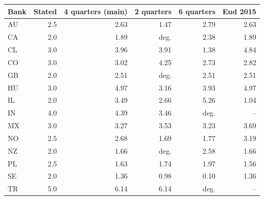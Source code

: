 \begin{tabular}{lrrrrr}\toprule
Bank & Stated & 4 quarters (main) & 2 quarters & 6 quarters & End 2015\\\midrule
AU & 2.5 & 2.63 & 1.47 & 2.79 & 2.63\\
CA & 2.0 & 1.89 & deg. & 2.38 & 1.89\\
CL & 3.0 & 3.96 & 3.91 & 1.38 & 4.84\\
CO & 3.0 & 3.02 & 4.25 & 2.73 & 2.82\\
GB & 2.0 & 2.51 & deg. & 2.51 & 2.51\\
HU & 3.0 & 4.97 & 3.16 & 3.93 & 4.97\\
IL & 2.0 & 3.49 & 2.66 & 5.26 & 1.04\\
IN & 4.0 & 4.39 & 3.46 & deg. & --\\
MX & 3.0 & 3.27 & 3.53 & 3.23 & 3.69\\
NO & 2.5 & 2.68 & 1.69 & 1.77 & 3.19\\
NZ & 2.0 & 1.66 & deg. & 2.58 & 1.66\\
PL & 2.5 & 1.63 & 1.74 & 1.97 & 1.56\\
SE & 2.0 & 1.36 & 0.98 & 0.10 & 1.36\\
TR & 5.0 & 6.14 & 6.14 & deg. & --\\
\bottomrule\end{tabular}